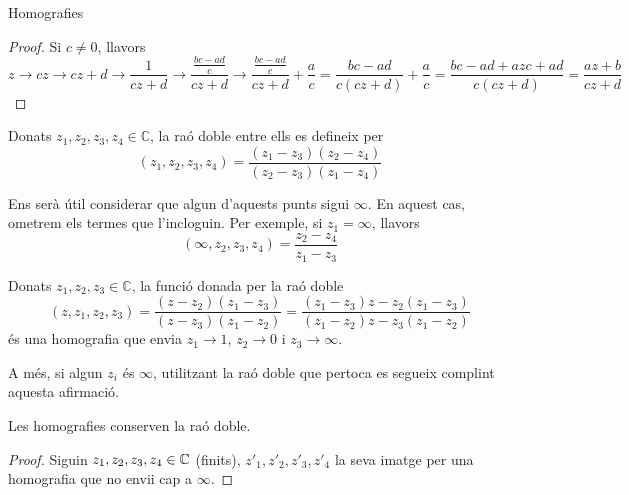\documentclass[dvipsnames, svgnames, leqno, a4paper, 12pt]{report}
\begin{document}
\begin{chapter}{Homografies}
\begin{proof}
            Si $c\neq0$, llavors \begin{displaymath}
                z\to cz\to cz+d\to \frac{1}{cz+d}\to \frac{\frac{bc-ad}{c}}{cz+d}\to \frac{\frac{bc-ad}{c}}{cz+d}+\frac{a}{c}=\frac{bc-ad}{c(cz+d)}+\frac{a}{c}=\frac{bc-ad+azc+ad}{c(cz+d)}=\frac{az+b}{cz+d}
            \end{displaymath}
        \end{proof}
        \begin{definition}
            Donats $z_1,z_2,z_3,z_4\in\mathbb{C}$, la raó doble entre ells es defineix per \begin{displaymath}
                (z_1,z_2,z_3,z_4) = \frac{(z_1-z_3)(z_2-z_4)}{(z_2-z_3)(z_1-z_4)}
            \end{displaymath}
            
            Ens serà útil considerar que algun d'aquests punts sigui $\infty$. En aquest cas, ometrem els termes que l'incloguin. Per exemple, si $z_1 = \infty$, llavors \begin{displaymath}
                (\infty, z_2,z_3,z_4) = \frac{z_2-z_4}{z_1-z_3}
            \end{displaymath}
        \end{definition}
    \begin{remark}
        Donats $z_1,z_2,z_3\in\mathbb{C}$, la funció donada per la raó doble \begin{equation}\label{eq:rao_doble}
            (z,z_1,z_2,z_3) = \frac{(z-z_2)(z_1-z_3)}{(z-z_3)(z_1-z_2)}=\frac{(z_1-z_3)z-z_2(z_1-z_3)}{(z_1-z_2)z-z_3(z_1-z_2)}
        \end{equation}
        és una homografia que envia $z_1\to1$, $z_2\to0$ i $z_3\to\infty$.

        A més, si algun $z_i$ és $\infty$, utilitzant la raó doble que pertoca es segueix complint aquesta afirmació.
    \end{remark}
    \begin{proposition}
        Les homografies conserven la raó doble.
    \end{proposition}
    \begin{proof}
        Siguin $z_1,z_2,z_3,z_4\in \mathbb{C}$ (finits), $z'_1,z'_2,z'_3,z'_4$ la seva imatge per una homografia que no envii cap a $\infty$.


\end{proof}
\end{chapter}
\end{document}
